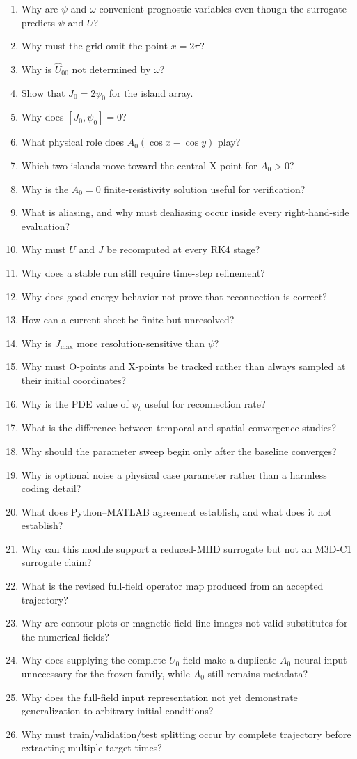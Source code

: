 \documentclass[11pt]{article}
\begin{document}
\begin{enumerate}[label=\textbf{Q\arabic*.}]
  \item Why are $\psi$ and $\omega$ convenient prognostic variables even though the surrogate predicts $\psi$ and $U$?
  \item Why must the grid omit the point $x=2\pi$?
  \item Why is $\widehat U_{00}$ not determined by $\omega$?
  \item Show that $J_0=2\psi_0$ for the island array.
  \item Why does $[J_0,\psi_0]=0$?
  \item What physical role does $A_0(\cos x-\cos y)$ play?
  \item Which two islands move toward the central X-point for $A_0>0$?
  \item Why is the $A_0=0$ finite-resistivity solution useful for verification?
  \item What is aliasing, and why must dealiasing occur inside every right-hand-side evaluation?
  \item Why must $U$ and $J$ be recomputed at every RK4 stage?
  \item Why does a stable run still require time-step refinement?
  \item Why does good energy behavior not prove that reconnection is correct?
  \item How can a current sheet be finite but unresolved?
  \item Why is $J_{\max}$ more resolution-sensitive than $\psi$?
  \item Why must O-points and X-points be tracked rather than always sampled at their initial coordinates?
  \item Why is the PDE value of $\psi_t$ useful for reconnection rate?
  \item What is the difference between temporal and spatial convergence studies?
  \item Why should the parameter sweep begin only after the baseline converges?
  \item Why is optional noise a physical case parameter rather than a harmless coding detail?
  \item What does Python--MATLAB agreement establish, and what does it not establish?
  \item Why can this module support a reduced-MHD surrogate but not an M3D-C1 surrogate claim?
  \item What is the revised full-field operator map produced from an accepted trajectory?
  \item Why are contour plots or magnetic-field-line images not valid substitutes for the numerical fields?
  \item Why does supplying the complete $U_0$ field make a duplicate $A_0$ neural input unnecessary for the frozen family, while $A_0$ still remains metadata?
  \item Why does the full-field input representation not yet demonstrate generalization to arbitrary initial conditions?
  \item Why must train/validation/test splitting occur by complete trajectory before extracting multiple target times?
\end{enumerate}
\end{document}
